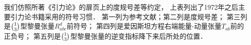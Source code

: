 \vspace{1em}

我们仿照\textcite{mtw1973}所著《引力论》的扉页上的度规号差等约定，
上表列出了1972年之后主要引力论书籍采用的符号习惯．
第一列为参考文献；第二列是度规号差；
第三列是$\binom{1}{3}$型黎曼张量$R^{d}_{abc}$前符号；
第四列是爱因斯坦方程右端能量-动量张量$T_{ab}$前的正负号；
第五列是$\binom{1}{3}$型黎曼张量的逆变指标降下来后所处的位置．











\printbibliography[heading=subbibliography,title=参考文献]


\endinput
